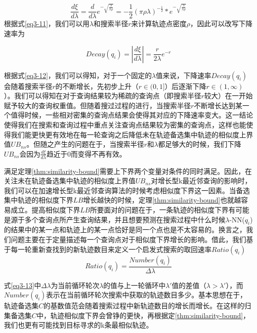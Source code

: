 \begin{equation}
\label{eq3-11}
\frac{d\xi}{d\lambda} = \frac{d}{d\lambda}e^{-\sqrt{\frac{\lambda}{\pi\rho}}} = -\frac{1}{2}(\pi\rho\lambda)^{-\frac{1}{2}}*e^{-\sqrt{\frac{\lambda}{\pi\rho}}}
\end{equation}
根据式\ref{eq3-11}，我们可以用$\lambda$和搜索半径$r$来计算轨迹点密度$\rho$，因此可以改写下降速率为

\begin{equation}
\label{eq3-12}
Decay(q_i) = |\frac{d\xi}{d\lambda}| = \frac{r}{2\lambda}e^{-r} 
\end{equation}

根据式\ref{eq3-12}，我们可以得知，对于一个固定的$\lambda$值来说，下降速率$Decay(q_i)$会随着搜索半径$r$的不断增长，先初步上升（$r\in(0,1]$）后逐渐下降$r\in(1,\infty)$）。我们可以得知在对于查询结果较为稀疏的查询点（即搜索半径$r$较大）在一开始赋予较大的查询权重值。但随着搜过过程的进行，当搜索半径$r$不断增长达到某一个值得时候，一些相对密集的查询点结果会使得其对应的下降速率变大。这一结论使得我们在搜索和查询过程中重点关注查询点结果较为密集的查询点，这样也能使得我们能更快更有效地在每一轮查询之后降低未在轨迹备选集中轨迹的相似度上界值$UB_{ns}$。但随之产生的问题在于，当搜索半径$r$和$\lambda$都足够大的时候，我们下降$UB_{ns}$会因为$\frac{d\xi}{d\lambda}$趋近于0而变得不再有效。

满足定理\ref{thm:similarity-bound}需要上下界两个变量对条件的同时满足。因此，在关注未在轨迹备选集中轨迹的相似度上界值$UB_{ns}$对增长型k最近邻查询的影响时，我们可以在加速增长型k最近邻查询算法的时候考虑相似度下界这一因素。当备选集中轨迹的相似度下界$LB$增长越快的时候，定理\ref{thm:similarity-bound}也就越容易成立。提高相似度下界$LB$所要面对的问题在于，一条轨迹的相似度下界有可能是源于多个查询点所产生查询结果，并且想要预测在搜索过程中什么时候$\lambda$-NN($q_i$)的结果中的某一点和轨迹上的某一点恰好是同一个点也是不太容易的。换言之，我们问题主要在于定量描述每一个查询点对于相似度下界增长的影响。借此，我们基于每一轮重新查找到的新轨迹数目来定义一个启发式搜索的取回速率$Ratio(q_i)$
\begin{equation}
\label{eq3-13}
Ratio(q_i) = \frac{Number(q_i)}{\Delta\lambda}
\end{equation}

式\ref{eq3-13}中$\Delta\lambda$为当前循环轮次$\lambda$的值与上一轮循环中$\lambda'$值的差值（$\lambda > \lambda'$），而$Number(q_i)$表示在当前循环轮次搜索中获取的轨迹数目多少。基本思想在于，轨迹备选集$C$的基数值范会随着搜索过程中新轨迹数目的增长而增长。在这样的归集备选集$C$中，轨迹相似度下界会曾铮的更快，再根据定\ref{thm:similarity-bound}，我们也更有可能找到目标寻求的k条最相似轨迹。


